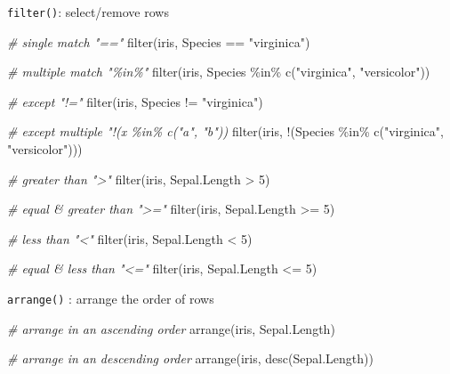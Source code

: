 \documentclass[
]{book}
\newenvironment{Shaded}{\begin{snugshade}}{\end{snugshade}}
\newcommand{\CommentTok}[1]{\textcolor[rgb]{0.56,0.35,0.01}{\textit{#1}}}
\newcommand{\DecValTok}[1]{\textcolor[rgb]{0.00,0.00,0.81}{#1}}
\newcommand{\FunctionTok}[1]{\textcolor[rgb]{0.00,0.00,0.00}{#1}}
\newcommand{\NormalTok}[1]{#1}
\newcommand{\SpecialCharTok}[1]{\textcolor[rgb]{0.00,0.00,0.00}{#1}}
\newcommand{\StringTok}[1]{\textcolor[rgb]{0.31,0.60,0.02}{#1}}
\begin{document}
\texttt{filter()}: select/remove rows

\begin{Shaded}
\begin{Highlighting}[]
\CommentTok{\# single match "=="}
\FunctionTok{filter}\NormalTok{(iris, Species }\SpecialCharTok{==} \StringTok{"virginica"}\NormalTok{)}

\CommentTok{\# multiple match "\%in\%"}
\FunctionTok{filter}\NormalTok{(iris, Species }\SpecialCharTok{\%in\%} \FunctionTok{c}\NormalTok{(}\StringTok{"virginica"}\NormalTok{, }\StringTok{"versicolor"}\NormalTok{))}

\CommentTok{\# except "!="}
\FunctionTok{filter}\NormalTok{(iris, Species }\SpecialCharTok{!=} \StringTok{"virginica"}\NormalTok{)}

\CommentTok{\# except multiple "!(x \%in\% c("a", "b"))}
\FunctionTok{filter}\NormalTok{(iris, }\SpecialCharTok{!}\NormalTok{(Species }\SpecialCharTok{\%in\%} \FunctionTok{c}\NormalTok{(}\StringTok{"virginica"}\NormalTok{, }\StringTok{"versicolor"}\NormalTok{)))}

\CommentTok{\# greater than "\textgreater{}"}
\FunctionTok{filter}\NormalTok{(iris, Sepal.Length }\SpecialCharTok{\textgreater{}} \DecValTok{5}\NormalTok{)}

\CommentTok{\# equal \& greater than "\textgreater{}="}
\FunctionTok{filter}\NormalTok{(iris, Sepal.Length }\SpecialCharTok{\textgreater{}=} \DecValTok{5}\NormalTok{)}

\CommentTok{\# less than "\textless{}"}
\FunctionTok{filter}\NormalTok{(iris, Sepal.Length }\SpecialCharTok{\textless{}} \DecValTok{5}\NormalTok{)}

\CommentTok{\# equal \& less than "\textless{}="}
\FunctionTok{filter}\NormalTok{(iris, Sepal.Length }\SpecialCharTok{\textless{}=} \DecValTok{5}\NormalTok{)}
\end{Highlighting}
\end{Shaded}

\texttt{arrange()} : arrange the order of rows

\begin{Shaded}
\begin{Highlighting}[]
\CommentTok{\# arrange in an ascending order}
\FunctionTok{arrange}\NormalTok{(iris, Sepal.Length)}

\CommentTok{\# arrange in an descending order}
\FunctionTok{arrange}\NormalTok{(iris, }\FunctionTok{desc}\NormalTok{(Sepal.Length))}
\end{Highlighting}
\end{Shaded}
\end{document}
